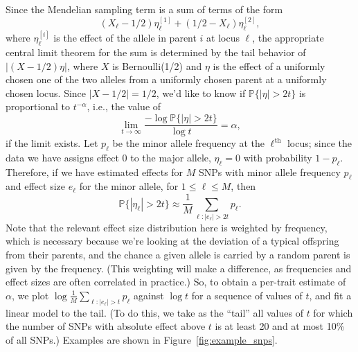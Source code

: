 \documentclass{article}
\renewcommand{\P}{\mathbb{P}}
\newcommand{\1}{\mathbbm{1}}
\theoremstyle{remark}
\theoremstyle{definition}
\begin{document}
Since the Mendelian sampling term is a sum of terms of the form
$$
    (X_\ell - 1/2) \eta_\ell^{[1]} + (1/2 - X_\ell) \eta_\ell^{[2]},
$$
where $\eta_\ell^{[i]}$ is the effect of the allele in parent $i$ at locus $\ell$,
the appropriate central limit theorem for the sum is determined by
the tail behavior of $|(X - 1/2) \eta|$,
where $X$ is Bernoulli(1/2) and $\eta$ is the effect
of a uniformly chosen one of the two alleles from a uniformly chosen parent
at a uniformly chosen locus.
Since $|X-1/2| = 1/2$, we'd like to know
if $\P\{|\eta|>2t\}$ is proportional to $t^{-\alpha}$,
i.e., the value of
$$
    \lim_{t \to \infty} \frac{ - \log \P\{ |\eta| > 2 t \} }{ \log t } = \alpha ,
$$
if the limit exists.
Let $p_\ell$ be the minor allele frequency at the $\ell^\text{th}$ locus;
since the data we have assigns effect 0 to the major allele,
$\eta_\ell = 0$ with probability $1-p_\ell$.
Therefore, if we have estimated effects for $M$ SNPs
with minor allele frequency $p_\ell$ and effect size $e_\ell$ for the minor allele,
for $1 \le \ell \le M$,
then
$$
    \P\{ |\eta_{\ell}| > 2t \} \approx \frac{1}{M} \sum_{\ell : |e_\ell| > 2t} p_\ell .
$$
Note that the relevant effect size distribution here is weighted by frequency, 
which is necessary because we're looking at the deviation of a typical offspring from their parents,
and the chance a given allele is carried by a random parent is given by the frequency.
(This weighting will make a difference, as frequencies and effect sizes are often correlated in practice.)
So, to obtain a per-trait estimate of $\alpha$,
we plot $\log \frac{1}{M} \sum_{\ell : |e_\ell| > t} p_\ell$ against $\log t$
for a sequence of values of $t$,
and fit a linear model to the tail.
(To do this,
we take as the ``tail''
all values of $t$ for which the number of SNPs with absolute effect above $t$
is at least 20 and at most 10\% of all SNPs.) 
Examples are shown in Figure~\ref{fig:example_snps}.
\end{document}
